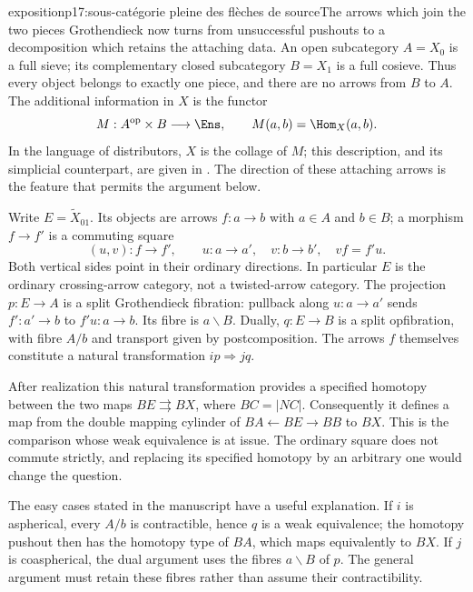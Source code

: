 \begin{dcomment}{exposition}{p17:sous-catégorie pleine des flèches de source}{The arrows which join the two pieces}
Grothendieck now turns from unsuccessful pushouts to a decomposition which retains the attaching data. An open subcategory $A=X_0$ is a full sieve; its complementary closed subcategory $B=X_1$ is a full cosieve. Thus every object belongs to exactly one piece, and there are no arrows from $B$ to $A$. The additional information in $X$ is the functor
\[
 M:A^{\mathrm{op}}\times B\longrightarrow\Ens,
 \qquad M(a,b)=\Hom_X(a,b).
\]
In the language of distributors, $X$ is the collage of $M$; this description, and its simplicial counterpart, are given in \citet[\S\S7.1--7.2, pp.~309--311]{Joyal2008Quasi}. The direction of these attaching arrows is the feature that permits the argument below.

Write $E=\widetilde X_{01}$. Its objects are arrows $f:a\to b$ with $a\in A$ and $b\in B$; a morphism $f\to f'$ is a commuting square
\[
 (u,v):f\longrightarrow f',\qquad
 u:a\to a',\quad v:b\to b',\quad vf=f'u.
\]
Both vertical sides point in their ordinary directions. In particular $E$ is the ordinary crossing-arrow category, not a twisted-arrow category. The projection $p:E\to A$ is a split Grothendieck fibration: pullback along $u:a\to a'$ sends $f':a'\to b$ to $f'u:a\to b$. Its fibre is $a\backslash B$. Dually, $q:E\to B$ is a split opfibration, with fibre $A/b$ and transport given by postcomposition. The arrows $f$ themselves constitute a natural transformation $ip\Rightarrow jq$.

After realization this natural transformation provides a specified homotopy between the two maps $BE\rightrightarrows BX$, where $BC=|NC|$. Consequently it defines a map from the double mapping cylinder of $BA\leftarrow BE\to BB$ to $BX$. This is the comparison whose weak equivalence is at issue. The ordinary square does not commute strictly, and replacing its specified homotopy by an arbitrary one would change the question.

The easy cases stated in the manuscript have a useful explanation. If $i$ is aspherical, every $A/b$ is contractible, hence $q$ is a weak equivalence; the homotopy pushout then has the homotopy type of $BA$, which maps equivalently to $BX$. If $j$ is coaspherical, the dual argument uses the fibres $a\backslash B$ of $p$. The general argument must retain these fibres rather than assume their contractibility.
\end{dcomment}

